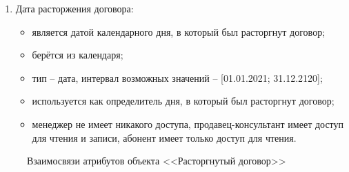 \begin{enumerate}
\begin{enumerate}
        \item Дата расторжения договора:
        \begin{itemize}
            \item является датой календарного дня, в который был расторгнут договор;
            \item берётся из календаря;
            \item тип -- дата, интервал возможных значений -- [01.01.2021; 31.12.2120];
            \item используется как определитель дня, в который был расторгнут договор;
            \item менеджер не имеет никакого доступа, продавец-консультант имеет доступ для чтения и записи, абонент имеет только доступ для чтения.
        \end{itemize}
    \end{enumerate}
    \begin{figure}[H]
        \label{fig:canceled-contract-attributes}
        \caption{Взаимосвязи атрибутов объекта <<Расторгнутый договор>>}
    \end{figure}

\end{enumerate}


